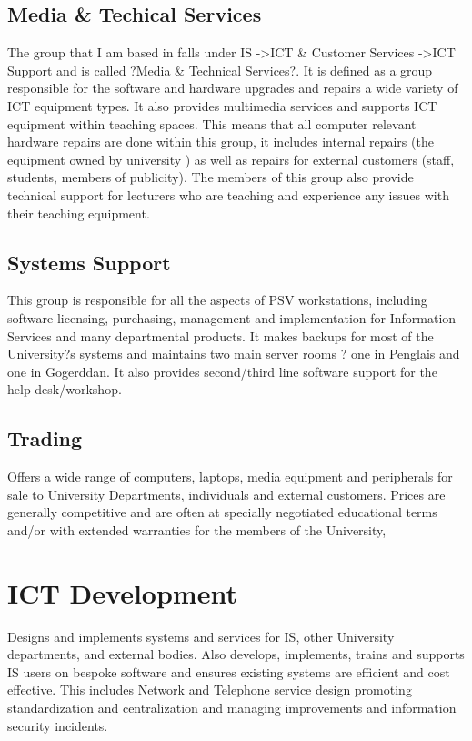 \documentclass[10pt,a4paper,headinclude=true]{report}
\begin{document}
\subsection{Media \& Techical Services}
The group that I am based in falls under IS -\textgreater ICT \& Customer Services -\textgreater ICT Support and is called ?Media \& Technical Services?. It is defined as a group responsible for the software and hardware upgrades and repairs a wide variety of ICT equipment types. It also provides multimedia services and supports ICT equipment within teaching spaces. This means that all computer relevant hardware repairs are done within this group, it includes internal repairs (the equipment owned by university ) as well as repairs for external customers (staff, students, members of publicity). The members of this group also provide technical support for lecturers who are teaching and experience any issues with their teaching equipment.
\subsection{Systems Support}
This group is responsible for all the aspects of PSV workstations, including software licensing, purchasing, management and implementation for Information Services and many departmental products. It makes backups for most of the University?s systems and maintains two main server rooms ? one in Penglais and one in Gogerddan. It also provides second/third line software support for the help-desk/workshop.
\subsection{Trading}
Offers a wide range of computers, laptops, media equipment and peripherals for sale to University Departments, individuals and external customers. Prices are generally competitive and are often at specially negotiated educational terms and/or with extended warranties for the members of the University,
\section{ICT Development}
Designs and implements systems and services for IS, other University departments, and external bodies. Also develops, implements, trains and supports IS users on bespoke software and ensures existing systems are efficient and cost effective. This includes Network and Telephone service design promoting standardization and centralization and managing improvements and information security incidents.
\end{document}
